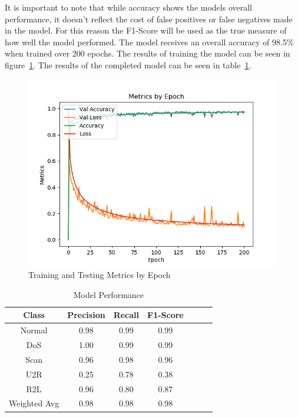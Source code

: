 \documentclass{article}
\begin{document}
It is important to note that while accuracy shows the models overall performance, it doesn't reflect the cost of false positives or false negatives made in the model. For this reason the F1-Score will be used as the true measure of how well the model performed. The model receives an overall accuracy of 98.5\% when trained over 200 epochs. The results of training the model can be seen in figure~\ref{fig:training-plot}. The results of the completed model can be seen in table~\ref{tab:model-results}.

\begin{figure}[!htb]
  \centering
  \includegraphics[totalheight=7cm]{figures/training-plot.png}
  \caption{Training and Testing Metrics by Epoch}
  \label{fig:training-plot}
  \centering
\end{figure}

\pagebreak

\begin{table}[!h]
\centering
\begin{tabular}{ |c|c|c|c|c|c|c| }
  \hline
  Class & Precision & Recall & F1-Score \\
  \hline
  Normal & 0.98 & 0.99 & 0.99 \\
  DoS    & 1.00 & 0.99 & 0.99 \\
  Scan   & 0.96 & 0.98 & 0.96 \\
  U2R   & 0.25 & 0.78 & 0.38 \\
  R2L    & 0.96 & 0.80 & 0.87 \\
  \hline
  Weighted Avg  & 0.98 & 0.98 & 0.98 \\
  \hline
\end{tabular}
\caption{Model Performance}
\label{tab:model-results}
\end{table}
\end{document}
